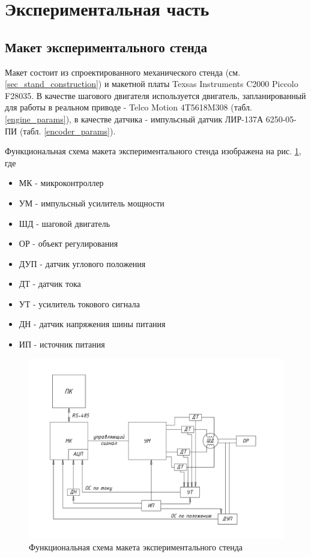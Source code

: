 \newpage
\section{Экспериментальная часть}
\subsection{Макет экспериментального стенда}

Макет состоит из спроектированного механического стенда (см. \ref{sec_stand_construction})
и макетной платы Texsas Instruments C2000 Piccolo F28035. В качестве шагового двигателя
используется двигатель, запланированный для работы в реальном приводе - Telco
Motion 4T5618M308 (табл. \ref{engine_params}), в качестве датчика
- импульсный датчик ЛИР-137А 6250-05-ПИ (табл. \ref{encoder_params}).

Функциональная схема макета экспериментального стенда изображена на рис.
\ref{pic_experim_stand_functional_scheme}, где

\begin{itemize}
    \item МК - микроконтроллер
    \item УМ - импульсный усилитель мощности
    \item ШД - шаговой двигатель
    \item ОР - объект регулирования
    \item ДУП - датчик углового положения
    \item ДТ - датчик тока
    \item УТ - усилитель токового сигнала
    \item ДН - датчик напряжения шины питания
    \item ИП - источник питания
\end{itemize}

\begin{figure}
    \centering
    \includegraphics[width=0.8\linewidth, keepaspectratio,
                    clip=true, trim=0mm 30mm 0mm 30mm]
                    {./src/pictures/experim_stand_functional_scheme}
    \caption{Функциональная схема макета экспериментального стенда}
    \label{pic_experim_stand_functional_scheme}
\end{figure}

